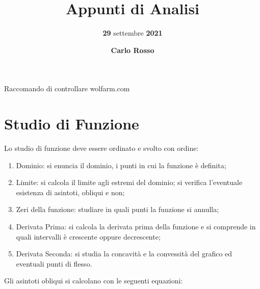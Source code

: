 \documentclass{article}
\title{\vspace{4cm}\textbf{Appunti di Analisi}}
\author{\textbf{29} settembre \textbf{2021}}
\date{\vspace{2mm}\textbf{Carlo Rosso}}
\begin{document}
\setcounter{secnumdepth}{1}
\newtheorem{dimostrazione}{Dimostrazione}[section]

\begin{titlepage}
	\maketitle
	\thispagestyle{empty}
\end{titlepage}

\tableofcontents

\newpage

Raccomando di controllare wolfarm.com


\newpage
\section{Studio di Funzione}

Lo studio di funzione deve essere ordinato e svolto con ordine:
\begin{enumerate}
	\item Dominio: si enuncia il dominio, i punti in cui la funzione è definita;

	\item Limite: si calcola il limite agli estremi del dominio; si verifica l'eventuale esistenza di asintoti, obliqui e non;

	\item Zeri della funzione: studiare in quali punti la funzione si annulla;

	\item Derivata Prima: si calcola la derivata prima della funzione e si comprende in quali intervalli è crescente oppure decrescente;

	\item Derivata Seconda: si studia la concavità e la convessità del grafico ed eventuali punti di flesso.
\end{enumerate}

Gli asintoti obliqui si calcolano con le seguenti equazioni:
\end{document}
